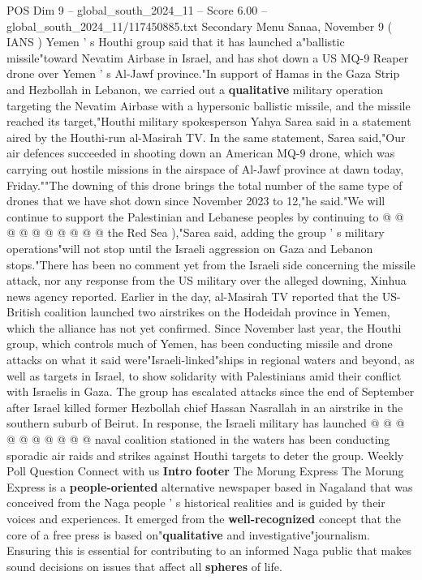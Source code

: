 \begin{textsample}{POS Dim 9 – global\_south\_2024\_11 – Score 6.00 – global\_south\_2024\_11/117450885.txt}  \label{ex:f9_pos_143}
Secondary Menu Sanaa, November 9 ( IANS ) Yemen ' s Houthi group said that it has launched a"ballistic missile"toward Nevatim Airbase in Israel, and has shot down a US MQ-9 Reaper drone over Yemen ' s Al-Jawf province."In support of Hamas in the Gaza Strip and Hezbollah in Lebanon, we carried out a \textbf{qualitative} military operation targeting the Nevatim Airbase with a hypersonic ballistic missile, and the missile reached its target,"Houthi military spokesperson Yahya Sarea said in a statement aired by the Houthi-run al-Masirah TV.
In the same statement, Sarea said,"Our air defences succeeded in shooting down an American MQ-9 drone, which was carrying out hostile missions in the airspace of Al-Jawf province at dawn today, Friday.""The downing of this drone brings the total number of the same type of drones that we have shot down since November 2023 to 12,"he said."We will continue to support the Palestinian and Lebanese peoples by continuing to @ @ @ @ @ @ @ @ @ @ the Red Sea ),"Sarea said, adding the group ' s military operations"will not stop until the Israeli aggression on Gaza and Lebanon stops."There has been no comment yet from the Israeli side concerning the missile attack, nor any response from the US military over the alleged downing, Xinhua news agency reported.
Earlier in the day, al-Masirah TV reported that the US-British coalition launched two airstrikes on the Hodeidah province in Yemen, which the alliance has not yet confirmed.
Since November last year, the Houthi group, which controls much of Yemen, has been conducting missile and drone attacks on what it said were"Israeli-linked"ships in regional waters and beyond, as well as targets in Israel, to show solidarity with Palestinians amid their conflict with Israelis in Gaza.
The group has escalated attacks since the end of September after Israel killed former Hezbollah chief Hassan Nasrallah in an airstrike in the southern suburb of Beirut.
In response, the Israeli military has launched @ @ @ @ @ @ @ @ @ @ naval coalition stationed in the waters has been conducting sporadic air raids and strikes against Houthi targets to deter the group.
Weekly Poll Question Connect with us \textbf{Intro} \textbf{footer} The Morung Express The Morung Express is a \textbf{people-oriented} alternative newspaper based in Nagaland that was conceived from the Naga people ' s historical realities and is guided by their voices and experiences.
It emerged from the \textbf{well-recognized} concept that the core of a free press is based on"\textbf{qualitative} and investigative"journalism.
Ensuring this is essential for contributing to an informed Naga public that makes sound decisions on issues that affect all \textbf{spheres} of life.

\end{textsample}
